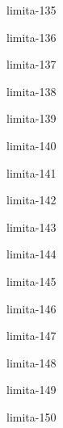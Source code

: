\begin{defproblem}{limita-135}

\end{defproblem}

\begin{defproblem}{limita-136}

\end{defproblem}

\begin{defproblem}{limita-137}

\end{defproblem}

\begin{defproblem}{limita-138}

\end{defproblem}

\begin{defproblem}{limita-139}

\end{defproblem}

\begin{defproblem}{limita-140}

\end{defproblem}

\begin{defproblem}{limita-141}

\end{defproblem}

\begin{defproblem}{limita-142}

\end{defproblem}

\begin{defproblem}{limita-143}

\end{defproblem}

\begin{defproblem}{limita-144}

\end{defproblem}

\begin{defproblem}{limita-145}

\end{defproblem}

\begin{defproblem}{limita-146}

\end{defproblem}

\begin{defproblem}{limita-147}

\end{defproblem}

\begin{defproblem}{limita-148}

\end{defproblem}

\begin{defproblem}{limita-149}

\end{defproblem}

\begin{defproblem}{limita-150}

\end{defproblem}